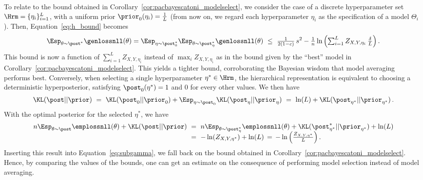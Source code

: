 \documentclass{article}
\theoremstyle{definition}
\theoremstyle{plain}
\begin{document}
		
%
To relate to the bound obtained in Corollary~\ref{cor:pacbayescatoni_modelselect}, we consider the case of a discrete hyperparameter set $\Hrm = \{\eta_i\}_{i=1}^L$, with a uniform prior $\prior_0(\eta_i)=\frac1L$ (from now on, we regard each hyperparameter $\eta_i$ as the specification of a model $\Theta_i$). 
Then, Equation~\eqref{eq:h_bound} becomes 
		\begin{equation*} %
		 \Esp_{\theta\sim\post^*} \genlossnll(\theta) 
		=  \Esp_{\eta\sim\post_0^*} \Esp_{\theta\sim\post_\eta^*} \genlossnll(\theta) 
		\ \leq\ 
%
\tfrac1{2(1-c)}\, s^2 - \tfrac{1}{n}\ln\left(  \textstyle \sum_{i=1}^L  Z_{X,Y,\eta_i}\,\tfrac \delta L \right). 
		\end{equation*}
%
This bound is now a function of $\sum_{i=1}^L  Z_{X,Y,\eta_i}$ instead of $\max_i Z_{X,Y,\eta_i}$ as in the bound given by the ``best'' model in Corollary~\ref{cor:pacbayescatoni_modelselect}.
This yields a tighter bound, corroborating the Bayesian wisdom that model averaging performs best. %
%
Conversely, when selecting a single hyperparameter $\eta^*\in\Hrm$, the hierarchical representation is equivalent to choosing a deterministic hyperposterior, satisfying $\post_0(\eta^*)=1$ and $0$ for every other values. We then have
\begin{align*}
 \KL(\post||\prior) \ =\ \KL(\post_0||\prior_0) + \Esp_{\eta \sim \post_0}  \KL(\post_\eta||\prior_\eta) 
 \ =\ \ln(L) + \KL(\post_{\eta^*}||\prior_{\eta^*})\,.
\end{align*}
With the optimal posterior for the selected $\eta^*$, we have
\begin{align*}
n \Esp_{\theta \sim \post} \emplossnll(\theta) +\KL(\post||\prior) & \ =\  n \Esp_{\theta \sim \post_\eta^*} \emplossnll(\theta) +\KL(\post_{\eta^*}^*||\prior_{\eta^*}) +\ln(L) \\[-2mm]
&\ =\ -\ln(Z_{X,Y,\eta^*}) + \ln(L) \, =\, -\ln \left( \tfrac{Z_{X,Y,\eta^*}}{L} \right).
\end{align*}
Inserting this result into Equation~\eqref{eq:subgamma}, we fall back on the bound obtained in Corollary~\ref{cor:pacbayescatoni_modelselect}.
Hence, by comparing the values of the bounds, one can get an estimate on the consequence of performing model selection instead of model averaging.

%

%
%

%
%

%
%


%
%
%


%
%
%
\end{document}
